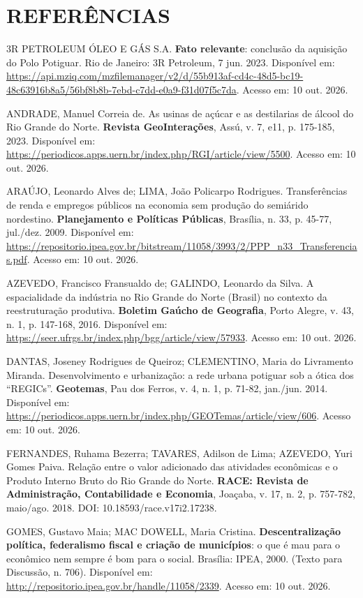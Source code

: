 \documentclass[12pt,a4paper]{article}
\newenvironment{referencias}{\begin{singlespace}\setlength{\parindent}{0pt}\setlength{\parskip}{6pt}\raggedright\footnotesize}{\end{singlespace}}
\begin{document}
\section*{REFERÊNCIAS}
\begin{referencias}

3R PETROLEUM ÓLEO E GÁS S.A. \textbf{Fato relevante}: conclusão da aquisição do Polo Potiguar. Rio de Janeiro: 3R Petroleum, 7 jun. 2023. Disponível em: \url{https://api.mziq.com/mzfilemanager/v2/d/55b913af-cd4c-48d5-bc19-48c63916b8a5/56bf8b8b-7ebd-c7dd-e0a9-f31d07f5c7da}. Acesso em: 10 out. 2026.

ANDRADE, Manuel Correia de. As usinas de açúcar e as destilarias de álcool do Rio Grande do Norte. \textbf{Revista GeoInterações}, Assú, v. 7, e11, p. 175-185, 2023. Disponível em: \url{https://periodicos.apps.uern.br/index.php/RGI/article/view/5500}. Acesso em: 10 out. 2026.

ARAÚJO, Leonardo Alves de; LIMA, João Policarpo Rodrigues. Transferências de renda e empregos públicos na economia sem produção do semiárido nordestino. \textbf{Planejamento e Políticas Públicas}, Brasília, n. 33, p. 45-77, jul./dez. 2009. Disponível em: \url{https://repositorio.ipea.gov.br/bitstream/11058/3993/2/PPP_n33_Transferencias.pdf}. Acesso em: 10 out. 2026.

AZEVEDO, Francisco Fransualdo de; GALINDO, Leonardo da Silva. A espacialidade da indústria no Rio Grande do Norte (Brasil) no contexto da reestruturação produtiva. \textbf{Boletim Gaúcho de Geografia}, Porto Alegre, v. 43, n. 1, p. 147-168, 2016. Disponível em: \url{https://seer.ufrgs.br/index.php/bgg/article/view/57933}. Acesso em: 10 out. 2026.

DANTAS, Joseney Rodrigues de Queiroz; CLEMENTINO, Maria do Livramento Miranda. Desenvolvimento e urbanização: a rede urbana potiguar sob a ótica dos ``REGICs''. \textbf{Geotemas}, Pau dos Ferros, v. 4, n. 1, p. 71-82, jan./jun. 2014. Disponível em: \url{https://periodicos.apps.uern.br/index.php/GEOTemas/article/view/606}. Acesso em: 10 out. 2026.

FERNANDES, Ruhama Bezerra; TAVARES, Adilson de Lima; AZEVEDO, Yuri Gomes Paiva. Relação entre o valor adicionado das atividades econômicas e o Produto Interno Bruto do Rio Grande do Norte. \textbf{RACE: Revista de Administração, Contabilidade e Economia}, Joaçaba, v. 17, n. 2, p. 757-782, maio/ago. 2018. DOI: 10.18593/race.v17i2.17238.

GOMES, Gustavo Maia; MAC DOWELL, Maria Cristina. \textbf{Descentralização política, federalismo fiscal e criação de municípios}: o que é mau para o econômico nem sempre é bom para o social. Brasília: IPEA, 2000. (Texto para Discussão, n. 706). Disponível em: \url{http://repositorio.ipea.gov.br/handle/11058/2339}. Acesso em: 10 out. 2026.


\end{referencias}
\end{document}
